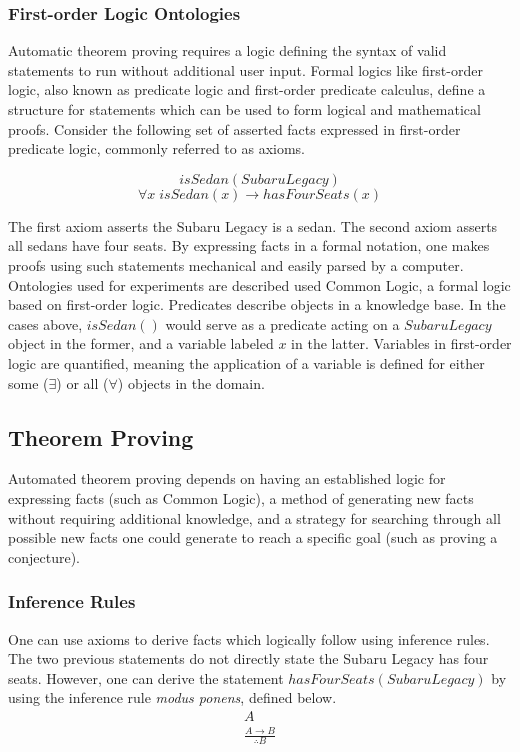 \documentclass{article}
\begin{document}
\subsubsection{First-order Logic Ontologies}

Automatic theorem proving requires a logic defining the syntax of valid statements to run without additional user input. Formal logics like first-order logic, also known as predicate logic and first-order predicate calculus, define a structure for statements which can be used to form logical and mathematical proofs. Consider the following set of asserted facts expressed in first-order predicate logic, commonly referred to as axioms. 

\begin{singlespace}
\[isSedan(Subaru Legacy)\]
\[\forall x \; isSedan(x) \rightarrow hasFourSeats(x)\]
\end{singlespace} 

The first axiom asserts the Subaru Legacy is a sedan. The second axiom asserts all sedans have four seats. By expressing facts in a formal notation, one makes proofs using such statements mechanical and easily parsed by a computer. Ontologies used for experiments are described used Common Logic, a formal logic based on first-order logic. Predicates describe objects in a knowledge base. In the cases above, $isSedan()$ would serve as a predicate acting on a $SubaruLegacy$ object in the former, and a variable labeled $x$ in the latter. Variables in first-order logic are quantified, meaning the application of a variable is defined for either some ($\exists$) or all ($\forall$) objects in the domain. 

\subsection{{Theorem Proving}}
Automated theorem proving depends on having an established logic for expressing facts (such as Common Logic), a method of generating new facts without requiring additional knowledge, and a strategy for searching through all possible new facts one could generate to reach a specific goal (such as proving a conjecture).

\subsubsection{Inference Rules}

One can use axioms to derive facts which logically follow using inference rules. The two previous statements do not directly state the Subaru Legacy has four seats. However, one can derive the statement $hasFourSeats(Subaru Legacy)$ by using the inference rule \textit{modus ponens}, defined below. 
\begin{equation}
\begin{gathered}
A \\
\frac{A \rightarrow B}{\therefore B}
\end{gathered}
\end{equation}
\end{document}
